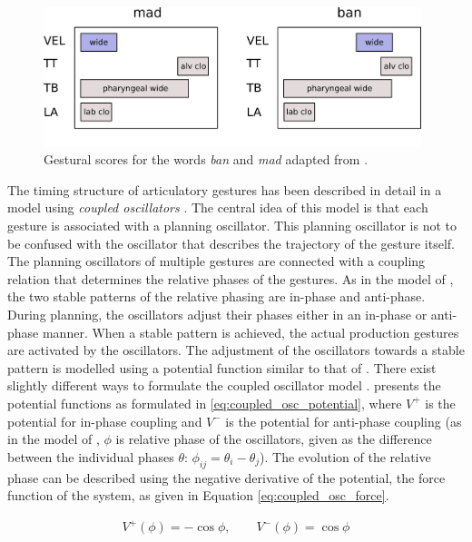 \begin{figure}
\includegraphics[width=11cm]{figures/ch3/ban_mad.pdf}
\caption{Gestural scores for the words \emph{ban} and \emph{mad} adapted from \citet{Goldsteinetal2009}.}
\label{fig:ban_mad}
\end{figure}

The timing structure of articulatory gestures has been described in detail in a model using \emph{coupled oscillators} \citep{SaltzmanByrd2000, NamSaltzman2003, Goldsteinetal2009, Tilsen2017}. The central idea of this model is that each gesture is associated with a planning oscillator. This planning oscillator is not to be confused with the oscillator that describes the trajectory of the gesture itself. The planning oscillators of multiple gestures are connected with a coupling relation that determines the relative phases of the gestures. As in the model of \citet{HakenKelsoBunz1985}, the two stable patterns of the relative phasing are in-phase and anti-phase. During planning, the oscillators adjust their phases either in an in-phase or anti-phase manner. When a stable pattern is achieved, the actual production gestures are activated by the oscillators. The adjustment of the oscillators towards a stable pattern is modelled using a potential function similar to that of \citet{HakenKelsoBunz1985}. There exist slightly different ways to formulate the coupled oscillator model \citep{SaltzmanByrd2000, Tilsen2017}. \citet{Tilsen2017} presents the potential functions as formulated in \ref{eq:coupled_osc_potential}, where $V^+$ is the potential for  in-phase coupling and $V^-$ is the potential for anti-phase coupling (as in the model of \citeauthor*{HakenKelsoBunz1985}, $\phi$ is relative phase of the oscillators, given as the difference between the individual phases $\theta$: $\phi_{ij} = \theta_i - \theta_j$). The evolution of the relative phase  can be described using the negative derivative of the potential, the force function of the system, as given in Equation \ref{eq:coupled_osc_force}.

\begin{equation}
\begin{split}
V^+(\phi) = -\cos\phi, \quad\quad
V^-(\phi) = \cos\phi
\label{eq:coupled_osc_potential}
\end{split}
\end{equation}

